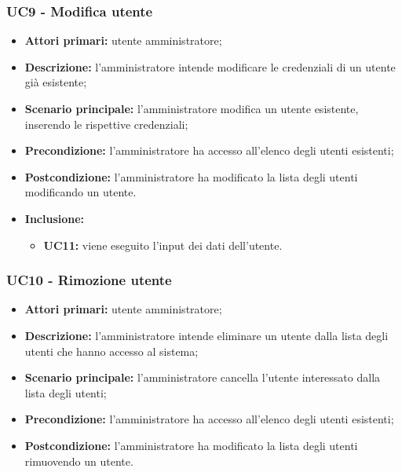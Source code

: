 \subsubsection{UC9 - Modifica utente}
	\begin{itemize}
		\item \textbf{Attori primari:} utente amministratore;
		\item \textbf{Descrizione:} l'amministratore intende modificare le credenziali di un utente già esistente;
		\item \textbf{Scenario principale:} l'amministratore modifica un utente esistente, inserendo le rispettive credenziali;
		\item \textbf{Precondizione:} l'amministratore ha accesso all'elenco degli utenti esistenti;
		\item \textbf{Postcondizione:} l'amministratore ha modificato la lista degli utenti modificando un utente.
		\item \textbf{Inclusione:} 
		\begin{itemize}
			\item \textbf{UC11:} viene eseguito l'input dei dati dell'utente.
		\end{itemize}
	\end{itemize}

\subsubsection{UC10 - Rimozione utente}
	\begin{itemize}
		\item \textbf{Attori primari:} utente amministratore;
		\item \textbf{Descrizione:} l'amministratore intende eliminare un utente dalla lista degli utenti che hanno accesso al sistema;
		\item \textbf{Scenario principale:} l'amministratore cancella l'utente interessato dalla lista degli utenti;
		\item \textbf{Precondizione:} l'amministratore ha accesso all'elenco degli utenti esistenti;
		\item \textbf{Postcondizione:} l'amministratore ha modificato la lista degli utenti rimuovendo un utente.
	\end{itemize}

